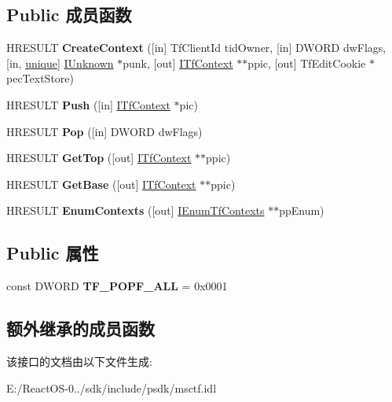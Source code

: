 \subsection*{Public 成员函数}
\begin{DoxyCompactItemize}
\item 
\mbox{\label{interface_i_tf_document_mgr_a7325246429707970fc827d8eb51972c9}} 
H\+R\+E\+S\+U\+LT {\bfseries Create\+Context} (\mbox{[}in\mbox{]} Tf\+Client\+Id tid\+Owner, \mbox{[}in\mbox{]} D\+W\+O\+RD dw\+Flags, \mbox{[}in, \hyperlink{interfaceunique}{unique}\mbox{]} \hyperlink{interface_i_unknown}{I\+Unknown} $\ast$punk, \mbox{[}out\mbox{]} \hyperlink{interface_i_tf_context}{I\+Tf\+Context} $\ast$$\ast$ppic, \mbox{[}out\mbox{]} Tf\+Edit\+Cookie $\ast$pec\+Text\+Store)
\item 
\mbox{\label{interface_i_tf_document_mgr_af4261c50a1cc1221c667411a71472f1d}} 
H\+R\+E\+S\+U\+LT {\bfseries Push} (\mbox{[}in\mbox{]} \hyperlink{interface_i_tf_context}{I\+Tf\+Context} $\ast$pic)
\item 
\mbox{\label{interface_i_tf_document_mgr_a9ad248e8e6ab2c16fa3ccc0d2ad7f00a}} 
H\+R\+E\+S\+U\+LT {\bfseries Pop} (\mbox{[}in\mbox{]} D\+W\+O\+RD dw\+Flags)
\item 
\mbox{\label{interface_i_tf_document_mgr_a3b260d351c9a17b3339d5731e34535f0}} 
H\+R\+E\+S\+U\+LT {\bfseries Get\+Top} (\mbox{[}out\mbox{]} \hyperlink{interface_i_tf_context}{I\+Tf\+Context} $\ast$$\ast$ppic)
\item 
\mbox{\label{interface_i_tf_document_mgr_a0b110f7d61ac34831c58c123741211f6}} 
H\+R\+E\+S\+U\+LT {\bfseries Get\+Base} (\mbox{[}out\mbox{]} \hyperlink{interface_i_tf_context}{I\+Tf\+Context} $\ast$$\ast$ppic)
\item 
\mbox{\label{interface_i_tf_document_mgr_af7cefdc9397715d3be3d1c645a3de251}} 
H\+R\+E\+S\+U\+LT {\bfseries Enum\+Contexts} (\mbox{[}out\mbox{]} \hyperlink{interface_i_enum_tf_contexts}{I\+Enum\+Tf\+Contexts} $\ast$$\ast$pp\+Enum)
\end{DoxyCompactItemize}
\subsection*{Public 属性}
\begin{DoxyCompactItemize}
\item 
\mbox{\label{interface_i_tf_document_mgr_abbb82d6e174edeac03829a0d9520711f}} 
const D\+W\+O\+RD {\bfseries T\+F\+\_\+\+P\+O\+P\+F\+\_\+\+A\+LL} = 0x0001
\end{DoxyCompactItemize}
\subsection*{额外继承的成员函数}


该接口的文档由以下文件生成\+:\begin{DoxyCompactItemize}
\item 
E\+:/\+React\+O\+S-\/0../sdk/include/psdk/msctf.\+idl\end{DoxyCompactItemize}
